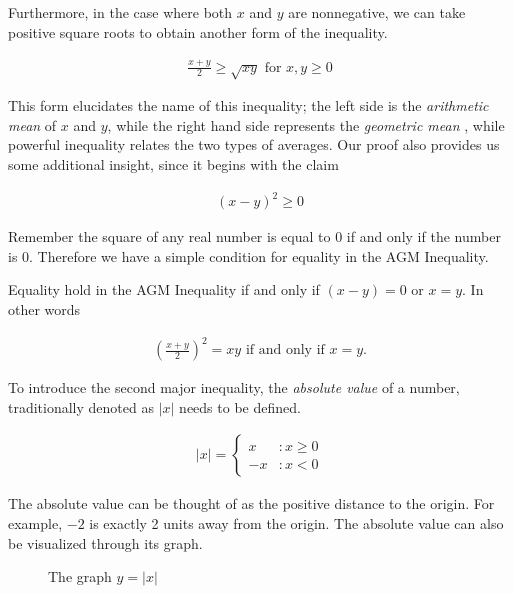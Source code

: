 \documentclass[twoside]{report}
\begin{document}
Furthermore, in the case where both $x$ and $y$ are nonnegative, we can take positive square roots to obtain another form of the inequality.

\begin{align*}
	\frac{x + y}{2} \ge \sqrt{xy} \text{ for } x, y \ge 0
\end{align*}

This form elucidates the name of this inequality; the left side is the \emph{arithmetic mean} of $x$ and $y$, while the right hand side represents the \emph{geometric mean} , while powerful inequality relates the two types of averages. Our proof also provides us some additional insight, since it begins with the claim

\begin{align*}
	(x - y)^2 \ge 0
\end{align*}

Remember the square of any real number is equal to 0 if and only if the number is 0. Therefore we have a simple condition for equality in the AGM Inequality.

\vspace{\baselineskip}
\begin{theorem}
	Equality hold in the AGM Inequality if and only if $(x - y) = 0$ or $x = y$. In other words
	
	\begin{align*}
		\left( \frac{x + y}{2} \right)^2 = xy \text{ if and only if } x = y.
	\end{align*}
\end{theorem}

To introduce the second major inequality, the \emph{absolute value}  of a number, traditionally denoted as $|x|$ needs to be defined.

\begin{align*}
	|x| = \begin{cases}
		x &: x \ge 0 \\
		-x &: x < 0
	\end{cases}
\end{align*}

The absolute value can be thought of as the positive distance to the origin. For example, $-2$ is exactly 2 units away from the origin. The absolute value can also be visualized through its graph.

\begin{figure}
	\begin{center}
	\end{center}
	\caption{The graph $y = |x|$}
\end{figure}
\end{document}

